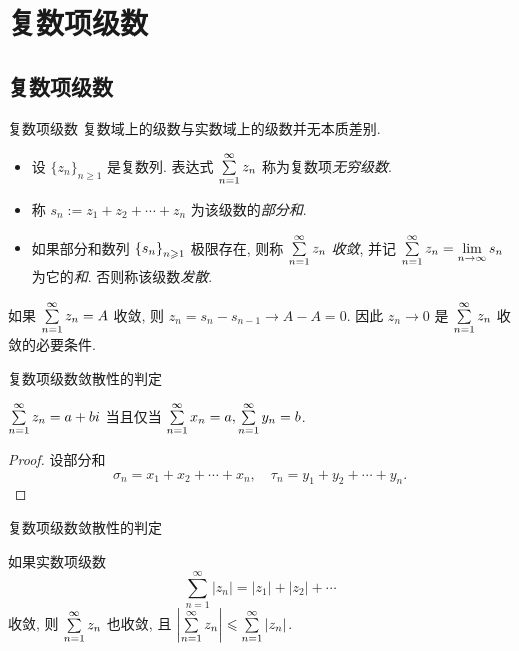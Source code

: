 \section{复数项级数}

\subsection{复数项级数}
\begin{frame}{复数项级数}
	\onslide<+->
	复数域上的级数与实数域上的级数并无本质差别.

	\onslide<+->
	\begin{definition}
		\begin{itemize}
			\item 设 $\{z_n\}_{n\ge1}$ 是复数列. 表达式 $\sum\limits_{n=1}^\infty z_n$ 称为复数项\emph{无穷级数}.
			\item 称 $s_n:=z_1+z_2+\cdots+z_n$ 为该级数的\emph{部分和}.
			\item 如果部分和数列 ${\left\{s_n\right\}}_{n\geqslant 1}$ 极限存在, 则称 $\sum\limits_{n=1}^\infty z_n$ \emph{收敛}, 并记 $\sum\limits_{n=1}^\infty z_n=\lim\limits_{n\to\infty}s_n$ 为它的\emph{和}. 否则称该级数\emph{发散}.
		\end{itemize}
	\end{definition}

	\onslide<+->
	如果 $\sum\limits_{n=1}^\infty z_n=A$ 收敛, 则 $z_n=s_n-s_{n-1}\to A-A=0$.
	\onslide<+->
	因此 \alert{$z_n\to0$ 是 $\sum\limits_{n=1}^\infty z_n$ 收敛的必要条件}.
\end{frame}


\begin{frame}{复数项级数敛散性的判定}
	\onslide<+->
	\begin{theorem}
		$\sum\limits_{n=1}^\infty z_n=a+bi$ 当且仅当 $\sum\limits_{n=1}^\infty x_n=a,\sum\limits_{n=1}^\infty y_n=b$.
	\end{theorem}

	\onslide<+->
	\begin{proof}
		设部分和
		\[\sigma_n=x_1+x_2+\cdots+x_n,\quad
			\tau_n=y_1+y_2+\cdots+y_n.\]
		\onslide<+->{于是命题得证.\qedhere}
	\end{proof}
\end{frame}


\begin{frame}{复数项级数敛散性的判定}
	\onslide<+->
	\begin{theorem}
		如果实数项级数
		\[\sum_{n=1}^\infty|z_n|=|z_1|+|z_2|+\cdots\]
		收敛, 则 $\sum\limits_{n=1}^\infty z_n$ 也收敛, 且 $\left|\sum\limits_{n=1}^\infty z_n\right|\leqslant\sum\limits_{n=1}^\infty |z_n|$.
	\end{theorem}
\end{frame}


